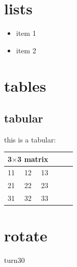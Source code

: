 \documentclass[11pt,a4paper]{article}
\begin{document}
\section{lists}
\begin{itemize}
\item item 1
\item item 2
\end{itemize}

\section{tables}{
  \subsection{tabular}
  this is a tabular: \\
  \begin{tabular}{lcr||lcr}
    \hline
    \multicolumn{3}{|c|}{3$\times$3 matrix} \\
    \hline
    11 & 12 & 13 \\
    \hline
    21 & 22 & 23 \\
    \cline{1-2}
    31 & 32 & 33
  \end{tabular}
}

\section{rotate}{
  \begin{turn}{30}turn30\end{turn}
}
\end{document}
